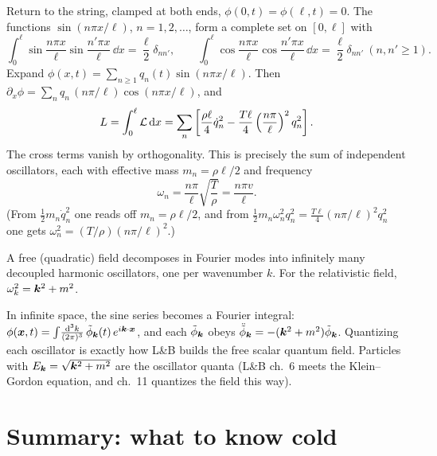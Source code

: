 \documentclass[11pt]{article}
\begin{document}
Return to the string, clamped at both ends, $\phi(0,t)=\phi(\ell,t)=0$. The functions $\sin(n\pi x/\ell)$, $n=1,2,\dots$, form a complete set on $[0,\ell]$ with
\[
  \int_0^\ell\sin\frac{n\pi x}{\ell}\sin\frac{n'\pi x}{\ell}\,\dd x=\frac\ell2\delta_{nn'},\qquad
  \int_0^\ell\cos\frac{n\pi x}{\ell}\cos\frac{n'\pi x}{\ell}\,\dd x=\frac\ell2\delta_{nn'}\ (n,n'\ge1).
\]
Expand $\phi(x,t)=\sum_{n\ge1}q_n(t)\sin(n\pi x/\ell)$. Then $\partial_x\phi=\sum_n q_n\,(n\pi/\ell)\cos(n\pi x/\ell)$, and
\begin{equation}
  L=\int_0^\ell\mathcal{L}\,\mathrm{d} x=\sum_{n}\left[\frac{\rho\ell}{4}\dot q_n^2-\frac{T\ell}{4}\left(\frac{n\pi}{\ell}\right)^2q_n^2\right].
\end{equation}
The cross terms vanish by orthogonality. This is precisely the sum of independent oscillators, each with effective mass $m_n=\rho\ell/2$ and frequency
\begin{equation}
  \omega_n=\frac{n\pi}{\ell}\sqrt{\frac T\rho}=\frac{n\pi v}{\ell}.
\end{equation}
(From $\tfrac12m_n\dot q_n^2$ one reads off $m_n=\rho\ell/2$, and from $\tfrac12m_n\omega_n^2q_n^2=\tfrac{T\ell}4(n\pi/\ell)^2q_n^2$ one gets $\omega_n^2=(T/\rho)(n\pi/\ell)^2$.)

\begin{keyresult}
A free (quadratic) field decomposes in Fourier modes into infinitely many decoupled harmonic oscillators, one per wavenumber $k$. For the relativistic field, $\omega_k^2=\bm{k}^2+m^2$.
\end{keyresult}

\begin{qftbridge}
In infinite space, the sine series becomes a Fourier integral: $\phi(\bm{x},t)=\int\!\frac{\mathrm{d}^3k}{(2\pi)^3}\,\tilde\phi_{\bm{k}}(t)\,e^{i\bm{k}\cdot\bm{x}}$, and each $\tilde\phi_{\bm{k}}$ obeys $\ddot{\tilde\phi}_{\bm{k}}=-(\bm{k}^2+m^2)\tilde\phi_{\bm{k}}$. Quantizing each oscillator is exactly how L\&B builds the free scalar quantum field. Particles with $E_{\bm{k}}=\sqrt{\bm{k}^2+m^2}$ are the oscillator quanta (L\&B ch.~6 meets the Klein--Gordon equation, and ch.~11 quantizes the field this way).
\end{qftbridge}

\section{Summary: what to know cold}
\end{document}
